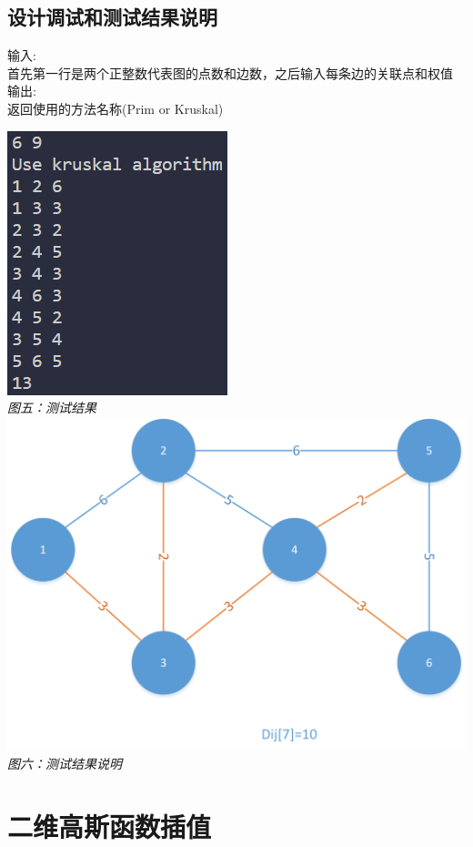 \documentclass[UTF8,a4paper]{article}
\begin{document}
\subsection{设计调试和测试结果说明}
输入:\\
首先第一行是两个正整数代表图的点数和边数，之后输入每条边的关联点和权值\\

输出:\\ 
返回使用的方法名称(Prim or Kruskal)\\
\begin{center}
\includegraphics[scale=0.6]{prim_kruskral.png}\\
\textit{图五：测试结果}\\
\includegraphics[scale=0.6]{tree.png}\\
\textit{图六：测试结果说明}\\
\end{center}
\newpage
\section{二维高斯函数插值}
\end{document}
